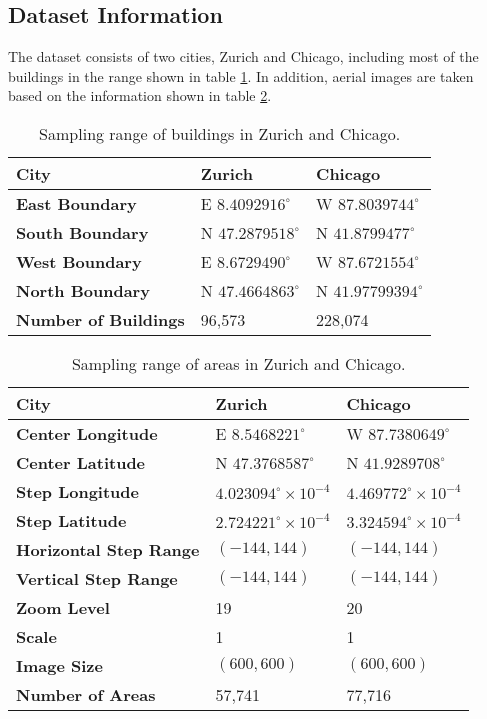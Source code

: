 \subsection{Dataset Information}\label{datainfo}

The dataset consists of two cities, Zurich and Chicago, including most of the buildings in the range shown in table \ref{tab:bldrange}. In addition, aerial images are taken based on the information shown in table \ref{tab:arerange}.

\begin{table}[!h]
	\centering
	\caption[Sampling range of buildings in Zurich and Chicago]{Sampling range of buildings in Zurich and Chicago.}
	\label{tab:bldrange}
	\begin{tabular}{l|l|l}
	\hline
	\textbf{City} & Zurich & Chicago \\ \hline
	\textbf{East Boundary} & E $8.4092916^\circ$ & W $87.8039744^\circ$ \\
	\textbf{South Boundary} & N $47.2879518^\circ$ & N $41.8799477^\circ$ \\
	\textbf{West Boundary} & E $8.6729490^\circ$ & W $87.6721554^\circ$ \\
	\textbf{North Boundary} & N $47.4664863^\circ$ & N $41.97799394^\circ$ \\
	\hline
	\textbf{Number of Buildings} & 96,573 & 228,074 \\
	\hline
	\end{tabular}
\end{table}
\begin{table}[!h]
	\centering
	\caption[Sampling range of areas in Zurich and Chicago]{Sampling range of areas in Zurich and Chicago.}
	\label{tab:arerange}
	\begin{tabular}{l|l|l}
	\hline
	\textbf{City} & Zurich & Chicago \\ \hline
	\textbf{Center Longitude }& E $8.5468221^\circ$ & W $87.7380649^\circ$ \\
	\textbf{Center Latitude} & N $47.3768587^\circ$ & N $41.9289708^\circ$ \\
	\textbf{Step Longitude} & $4.023094^\circ\times10^{-4}$ & $4.469772^\circ\times10^{-4}$ \\
	\textbf{Step Latitude} & $2.724221^\circ\times10^{-4}$ & $3.324594^\circ\times10^{-4}$ \\
	\textbf{Horizontal Step Range} & $(-144, 144)$ & $(-144, 144)$ \\
	\textbf{Vertical Step Range} & $(-144, 144)$ & $(-144, 144)$ \\
	\textbf{Zoom Level} & 19 & 20 \\
	\textbf{Scale} & 1 & 1 \\
	\textbf{Image Size} & $(600, 600)$ & $(600, 600)$ \\
	\hline
	\textbf{Number of Areas} & 57,741 & 77,716 \\
	\hline
	\end{tabular}
\end{table}

